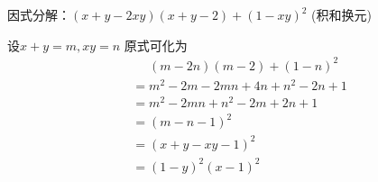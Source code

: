 \documentclass[windows,csize4,answers]{BHCexam}
\begin{document}
\begin{groups}
\begin{questions}[]
        \question[5] 因式分解：$(x+y-2xy)(x+y-2)+(1-xy)^2$ (积和换元)
        \begin{solution}{0.5cm}
            \methodonly 设$x+y=m,xy=n$ 原式可化为
            \[
                \begin{aligned}
                     & \phantom{=}(m-2n)(m-2)+(1-n)^2 \\
                     & = m^2-2m-2mn+4n+n^2-2n+1 \\ 
                     & = m^2-2mn+n^2-2m+2n+1 \\ %
                     & = (m-n-1)^2 \\ 
                     & = (x+y-xy-1)^2 \\ 
                     & = (1-y)^2(x-1)^2
                \end{aligned}
            \]
        \end{solution}
        \vspace{3.5cm}




    \end{questions}
\end{groups}

\label{lastpage}
\end{document}
